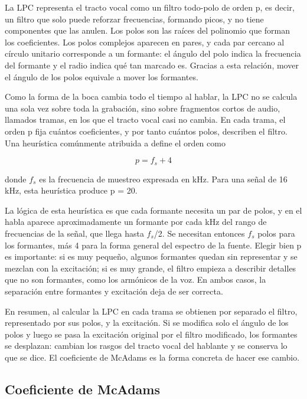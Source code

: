 \documentclass[10pt,twocolumn]{article}
\newcommand{\textcite}[1]{\citet{#1}}
\begin{document}
La LPC representa el tracto vocal como un filtro todo-polo de orden p, es decir, un filtro que solo puede reforzar frecuencias, formando picos, y no tiene componentes que las anulen. Los polos son las raíces del polinomio que forman los coeficientes. Los polos complejos aparecen en pares, y cada par cercano al círculo unitario corresponde a un formante: el ángulo del polo indica la frecuencia del formante y el radio indica qué tan marcado es. Gracias a esta relación, mover el ángulo de los polos equivale a mover los formantes.

Como la forma de la boca cambia todo el tiempo al hablar, la LPC no se calcula una sola vez sobre toda la grabación, sino sobre fragmentos cortos de audio, llamados tramas, en los que el tracto vocal casi no cambia. En cada trama, el orden p fija cuántos coeficientes, y por tanto cuántos polos, describen el filtro. Una heurística comúnmente atribuida a \textcite{markel1976} define el orden como

\begin{equation}\label{eq:lpcorder}
p = f_s + 4
\end{equation}

\noindent donde $f_s$ es la frecuencia de muestreo expresada en kHz. Para una señal de 16 kHz, esta heurística produce p = 20.

La lógica de esta heurística es que cada formante necesita un par de polos, y en el habla aparece aproximadamente un formante por cada kHz del rango de frecuencias de la señal, que llega hasta $f_s$/2. Se necesitan entonces $f_s$ polos para los formantes, más 4 para la forma general del espectro de la fuente. Elegir bien p es importante: si es muy pequeño, algunos formantes quedan sin representar y se mezclan con la excitación; si es muy grande, el filtro empieza a describir detalles que no son formantes, como los armónicos de la voz. En ambos casos, la separación entre formantes y excitación deja de ser correcta.

En resumen, al calcular la LPC en cada trama se obtienen por separado el filtro, representado por sus polos, y la excitación. Si se modifica solo el ángulo de los polos y luego se pasa la excitación original por el filtro modificado, los formantes se desplazan: cambian los rasgos del tracto vocal del hablante y se conserva lo que se dice. El coeficiente de McAdams es la forma concreta de hacer ese cambio.

\subsection{Coeficiente de McAdams}\label{sec:2.7}
\end{document}
